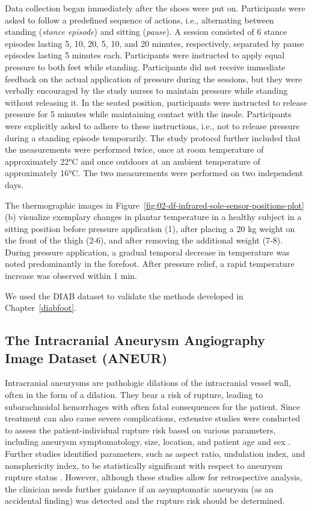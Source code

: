 \documentclass[
  oneside]{book}
\begin{document}
Data collection began immediately after the shoes were put on.
Participants were asked to follow a predefined sequence of actions, i.e., alternating between standing (\emph{stance episode}) and sitting (\emph{pause}).
A session consisted of 6 stance episodes lasting 5, 10, 20, 5, 10, and 20 minutes, respectively, separated by pause episodes lasting 5 minutes each.
Participants were instructed to apply equal pressure to both feet while standing.
Participants did not receive immediate feedback on the actual application of pressure during the sessions, but they were verbally encouraged by the study nurses to maintain pressure while standing without releasing it.
In the seated position, participants were instructed to release pressure for 5 minutes while maintaining contact with the insole.
Participants were explicitly asked to adhere to these instructions, i.e., not to release pressure during a standing episode temporarily.
The study protocol further included that the measurements were performed twice, once at room temperature of approximately 22°C and once outdoors at an ambient temperature of approximately 16°C.
The two measurements were performed on two independent days.

The thermographic images in Figure~\ref{fig:02-df-infrared-sole-sensor-positions-plot} (b) visualize exemplary changes in plantar temperature in a healthy subject in a sitting position before pressure application (1), after placing a 20 kg weight on the front of the thigh (2-6), and after removing the additional weight (7-8).
During pressure application, a gradual temporal decrease in temperature was noted predominantly in the forefoot.
After pressure relief, a rapid temperature increase was observed within 1 min.

We used the DIAB dataset to validate the methods developed in Chapter~\ref{diabfoot}.

\hypertarget{background-data-aneur}{%
\subsection{The Intracranial Aneurysm Angiography Image Dataset (ANEUR)}\label{background-data-aneur}}

Intracranial aneurysms are pathologic dilations of the intracranial vessel wall, often in the form of a dilation.
They bear a risk of rupture, leading to subarachnoidal hemorrhages with often fatal consequences for the patient.
Since treatment can also cause severe complications, extensive studies were conducted to assess the patient-individual rupture risk based on various parameters, including aneurysm symptomatology, size, location, and patient age and sex \autocite{Wermer2007}.
Further studies identified parameters, such as aspect ratio, undulation index, and nonsphericity index, to be statistically significant with respect to aneurysm rupture status \autocite{Dhar2008,Xiang2011}.
However, although these studies allow for retrospective analysis, the clinician needs further guidance if an asymptomatic aneurysm (as an accidental finding) was detected and the rupture risk should be determined.
\end{document}
